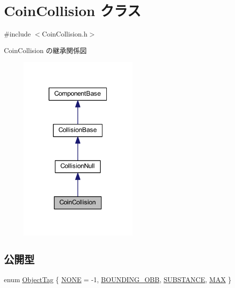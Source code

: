 \hypertarget{class_coin_collision}{}\section{Coin\+Collision クラス}
\label{class_coin_collision}


{\ttfamily \#include $<$Coin\+Collision.\+h$>$}



Coin\+Collision の継承関係図\nopagebreak
\begin{figure}[H]
\begin{center}
\leavevmode
\includegraphics[width=169pt]{class_coin_collision__inherit__graph}
\end{center}
\end{figure}
\subsection*{公開型}
\begin{DoxyCompactItemize}
\item 
enum \mbox{\hyperlink{class_coin_collision_ade7912345747f522fd895e87621ce049}{Object\+Tag}} \{ \mbox{\hyperlink{class_coin_collision_ade7912345747f522fd895e87621ce049aa520033eb3664c6f516082c22efd5d17}{N\+O\+NE}} = -\/1, 
\mbox{\hyperlink{class_coin_collision_ade7912345747f522fd895e87621ce049a003d6865c3e811586f2b96d25c4b6375}{B\+O\+U\+N\+D\+I\+N\+G\+\_\+\+O\+BB}}, 
\mbox{\hyperlink{class_coin_collision_ade7912345747f522fd895e87621ce049ab3dfdeacfa9cf71c167dfb2faec4612f}{S\+U\+B\+S\+T\+A\+N\+CE}}, 
\mbox{\hyperlink{class_coin_collision_ade7912345747f522fd895e87621ce049afe668be7d8cc9606f4c5be2220c38281}{M\+AX}}
 \}
\end{DoxyCompactItemize}
